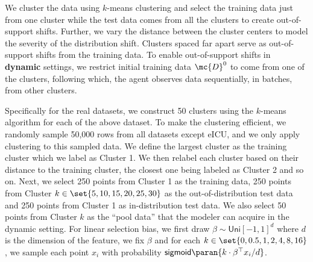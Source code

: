  We cluster the data using  $k$-means clustering and select the training data just from one cluster while the test data comes from all the clusters to create out-of-support shifts. Further, we vary the distance between the cluster centers to model the severity of the distribution shift. Clusters spaced far apart serve as out-of-support shifts from the training data.  
To enable out-of-support shifts in {\bf{dynamic}} settings, we restrict initial training data $\mc{D}^0$ to come  from one of the clusters, following which, the agent observes data sequentially, in batches, from other clusters. %

Specifically for the real datasets,  
we construct 
50 clusters using the $k$-means algorithm for each of the above dataset.
To make the clustering efficient,
we randomly sample 50,000 rows from all datasets except eICU, and we only apply clustering to this sampled data.
We define the largest cluster as the training cluster which we label as Cluster 1.  
We then relabel each cluster based on their distance  to the training cluster, the closest  one being labeled as Cluster 2 and so on. 
Next, we  select 250 points from Cluster 1 as the training data, 250 points from Cluster $k \in \set{5,10,15,20,25,30}$ as the out-of-distribution test data
and 250 points from Cluster 1 as in-distribution test data.
We also select 50 points from Cluster $k$ as the ``pool data'' that the modeler can acquire in the dynamic setting.
For linear selection bias,   we 
first draw $\beta \sim \mathsf{Uni}[-1,1]^d$ where $d$ is the dimension of the feature, we fix $\beta$ and  for each $k \in \set{0,0.5,1,2,4,8,16}$, 
we sample each point $x_i$ with probability 
$\mathsf{sigmoid}\paran{k \cdot \beta^\top x_i/d}$.




